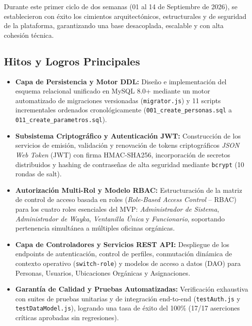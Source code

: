 \documentclass[a4paper,12pt]{article}
\begin{document}
Durante este primer ciclo de dos semanas (01 al 14 de Septiembre de 2026), se establecieron con éxito los cimientos arquitectónicos, estructurales y de seguridad de la plataforma, garantizando una base desacoplada, escalable y con alta cohesión técnica.

\subsection{Hitos y Logros Principales}
\begin{itemize}[leftmargin=1.5em]
    \item \textbf{Capa de Persistencia y Motor DDL:} Diseño e implementación del esquema relacional unificado en MySQL 8.0+ mediante un motor automatizado de migraciones versionadas (\texttt{migrator.js}) y 11 scripts incrementales ordenados cronológicamente (\texttt{001\_create\_personas.sql} a \texttt{011\_create\_parametros.sql}).
    \item \textbf{Subsistema Criptográfico y Autenticación JWT:} Construcción de los servicios de emisión, validación y renovación de tokens criptográficos \emph{JSON Web Token} (JWT) con firma HMAC-SHA256, incorporación de secretos distribuidos y hashing de contraseñas de alta seguridad mediante \texttt{bcrypt} (10 rondas de salt).
    \item \textbf{Autorización Multi-Rol y Modelo RBAC:} Estructuración de la matriz de control de acceso basada en roles (\emph{Role-Based Access Control} -- RBAC) para los cuatro roles esenciales del MVP: \emph{Administrador de Sistema}, \emph{Administrador de Wayka}, \emph{Ventanilla Única} y \emph{Funcionario}, soportando pertenencia simultánea a múltiples oficinas orgánicas.
    \item \textbf{Capa de Controladores y Servicios REST API:} Despliegue de los endpoints de autenticación, control de perfiles, conmutación dinámica de contexto operativo (\texttt{switch-role}) y modelos de acceso a datos (DAO) para Personas, Usuarios, Ubicaciones Orgánicas y Asignaciones.
    \item \textbf{Garantía de Calidad y Pruebas Automatizadas:} Verificación exhaustiva con suites de pruebas unitarias y de integración end-to-end (\texttt{testAuth.js} y \texttt{testDataModel.js}), logrando una tasa de éxito del 100\% (17/17 aserciones críticas aprobadas sin regresiones).
\end{itemize}

\end{document}

